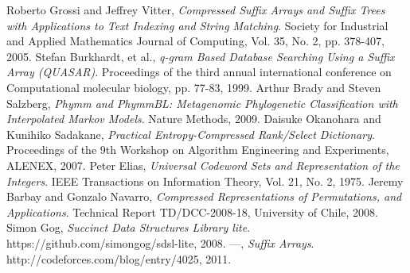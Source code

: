 \documentclass{article}
\begin{document}
\begin{thebibliography}{1}
	Roberto Grossi and Jeffrey Vitter,
	\emph{Compressed Suffix Arrays and Suffix Trees with Applications to Text Indexing and String Matching}.
	Society for Industrial and Applied Mathematics Journal of Computing,
	Vol. 35, No. 2, pp. 378-407,
	2005.
	Stefan Burkhardt, et al.,
	\emph{q-gram Based Database Searching Using a Suffix Array (QUASAR)}.
	Proceedings of the third annual international conference on Computational molecular biology,
	pp. 77-83,
	1999.
	Arthur Brady and Steven Salzberg,
	\emph{Phymm and PhymmBL: Metagenomic Phylogenetic Classification with Interpolated Markov Models}.
	Nature Methods,
	2009.
	Daisuke Okanohara and Kunihiko Sadakane,
	\emph{Practical Entropy-Compressed Rank/Select Dictionary}. 
	Proceedings of the 9th Workshop on Algorithm Engineering and Experiments,
	ALENEX,
	2007.
	Peter Elias,
	\emph{Universal Codeword Sets and Representation of the Integers}.
	IEEE Transactions on Information Theory,
	Vol. 21, No. 2,
	1975.
	Jeremy Barbay and Gonzalo Navarro,
	\emph{Compressed Representations of Permutations, and Applications}.
	Technical Report TD/DCC-2008-18,
	University of Chile,
	2008.
	Simon Gog,
	\emph{Succinct Data Structures Library lite}.
	https://github.com/simongog/sdsl-lite,
	2008.
	---,
	\emph{Suffix Arrays}.
	http://codeforces.com/blog/entry/4025,
	2011.
\end{thebibliography}
\end{document}

